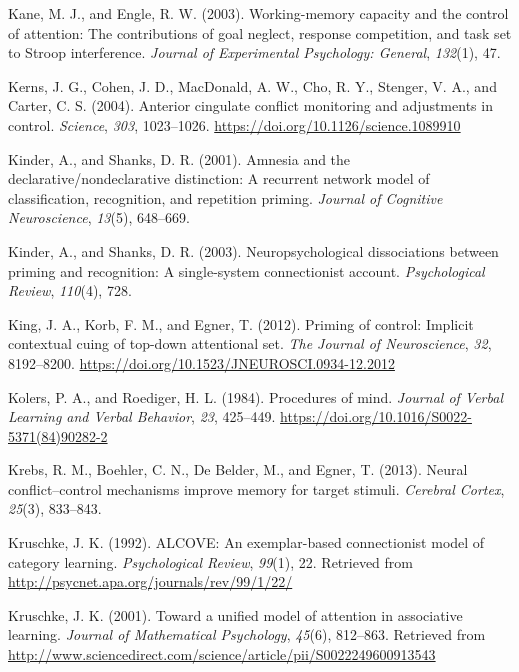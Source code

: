 \documentclass[]{DissertateCUNY}
\begin{document}
\leavevmode\hypertarget{ref-kane_working-memory_2003}{}%
Kane, M. J., and Engle, R. W. (2003). Working-memory capacity and the
control of attention: The contributions of goal neglect, response
competition, and task set to Stroop interference. \emph{Journal of
Experimental Psychology: General}, \emph{132}(1), 47.

\leavevmode\hypertarget{ref-kerns_anterior_2004}{}%
Kerns, J. G., Cohen, J. D., MacDonald, A. W., Cho, R. Y., Stenger, V.
A., and Carter, C. S. (2004). Anterior cingulate conflict monitoring and
adjustments in control. \emph{Science}, \emph{303}, 1023--1026.
\url{https://doi.org/10.1126/science.1089910}

\leavevmode\hypertarget{ref-kinder_amnesia_2001}{}%
Kinder, A., and Shanks, D. R. (2001). Amnesia and the
declarative/nondeclarative distinction: A recurrent network model of
classification, recognition, and repetition priming. \emph{Journal of
Cognitive Neuroscience}, \emph{13}(5), 648--669.

\leavevmode\hypertarget{ref-kinder_neuropsychological_2003}{}%
Kinder, A., and Shanks, D. R. (2003). Neuropsychological dissociations
between priming and recognition: A single-system connectionist account.
\emph{Psychological Review}, \emph{110}(4), 728.

\leavevmode\hypertarget{ref-king_priming_2012}{}%
King, J. A., Korb, F. M., and Egner, T. (2012). Priming of control:
Implicit contextual cuing of top-down attentional set. \emph{The Journal
of Neuroscience}, \emph{32}, 8192--8200.
\url{https://doi.org/10.1523/JNEUROSCI.0934-12.2012}

\leavevmode\hypertarget{ref-kolers_procedures_1984}{}%
Kolers, P. A., and Roediger, H. L. (1984). Procedures of mind.
\emph{Journal of Verbal Learning and Verbal Behavior}, \emph{23},
425--449. \url{https://doi.org/10.1016/S0022-5371(84)90282-2}

\leavevmode\hypertarget{ref-krebs_neural_2013}{}%
Krebs, R. M., Boehler, C. N., De Belder, M., and Egner, T. (2013).
Neural conflict--control mechanisms improve memory for target stimuli.
\emph{Cerebral Cortex}, \emph{25}(3), 833--843.

\leavevmode\hypertarget{ref-kruschke_alcove_1992}{}%
Kruschke, J. K. (1992). ALCOVE: An exemplar-based connectionist model of
category learning. \emph{Psychological Review}, \emph{99}(1), 22.
Retrieved from \url{http://psycnet.apa.org/journals/rev/99/1/22/}

\leavevmode\hypertarget{ref-kruschke_toward_2001}{}%
Kruschke, J. K. (2001). Toward a unified model of attention in
associative learning. \emph{Journal of Mathematical Psychology},
\emph{45}(6), 812--863. Retrieved from
\url{http://www.sciencedirect.com/science/article/pii/S0022249600913543}
\end{document}
